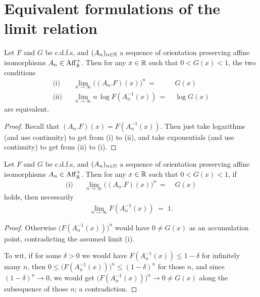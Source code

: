 \section{Equivalent formulations of the limit relation}

\begin{lemma}
  \label{lem:log-ev-limit}
  \leanok
  Let $F$ and $G$ be c.d.f.s, and $(A_n)_{n \in \mathbb{N}}$ a sequence of orientation
  preserving affine isomorphisms $A_n \in \mathrm{Aff}^+_{\mathbb{R}}$. Then for any $x \in \mathbb{R}$
  such that $0 < G(x) < 1$, the two conditions
  \begin{align*}
  \text{(i)} & & \lim_{n \to \infty} \big( (A_n.F)(x) \big)^n \, = \; & G(x) \\
  \text{(ii)} & & \lim_{n \to \infty} n \, \log F (A_n^{-1}(x)) \, = \; & \log G(x)
  \end{align*}
  are equivalent.
\end{lemma}
\begin{proof}
  Recall that $(A_n.F)(x) = F (A_n^{-1}(x))$.
  Then just take logarithms (and use continuity) to get from (i) to (ii),
  and take exponentials (and use continuity) to get from (ii) to (i).
\end{proof}

\begin{lemma}
  \label{lem:ev-limit-cdf-affine-tendsto-one}
  \leanok
  Let $F$ and $G$ be c.d.f.s, and $(A_n)_{n \in \mathbb{N}}$ a sequence of orientation
  preserving affine isomorphisms $A_n \in \mathrm{Aff}^+_{\mathbb{R}}$. Then for any $x \in \mathbb{R}$
  such that $0 < G(x) < 1$, if
  \begin{align*}
  \text{(i)} & & \lim_{n \to \infty} \big( (A_n.F)(x) \big)^n \, = \; & G(x)
  \end{align*}
  holds, then necessarily
  \begin{align*}
    \lim_{n \to \infty} F (A_n^{-1}(x)) \; = \; 1 .
  \end{align*}
\end{lemma}
\begin{proof}
  Otherwise $\big( F (A_n^{-1}(x)) \big)^n$ would have $0 \ne G(x)$
  as an accumulation point, contradicting the assumed limit (i).

  To wit, if for some $\delta > 0$ we would have
  $F (A_n^{-1}(x)) \le 1 - \delta$ for infinitely many $n$, then
  $0 \le \big( F (A_n^{-1}(x)) \big)^n \le (1 - \delta)^n $
  for those $n$, and since $(1 - \delta)^n \to 0$, we would
  get $\big( F (A_n^{-1}(x)) \big)^n \to 0 \ne G(x)$ along the
  subsequence of those $n$; a contradiction.
\end{proof}

